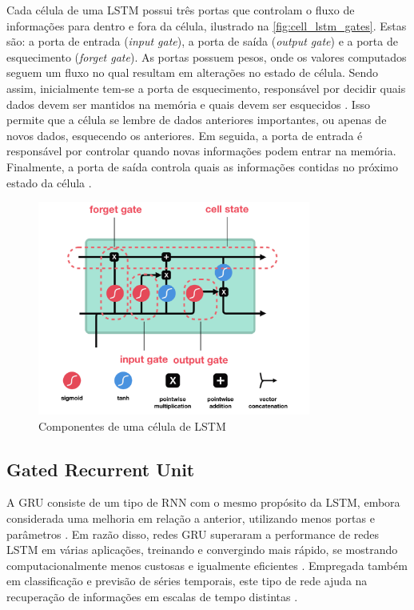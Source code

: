 Cada célula de uma LSTM possui três portas que controlam o fluxo de informações para dentro e fora da célula, ilustrado na \autoref{fig:cell_lstm_gates}. Estas são: a porta de entrada (\textit{input gate}), a porta de saída (\textit{output gate}) e a porta de esquecimento (\textit{forget gate}). As portas possuem pesos, onde os valores computados seguem um fluxo no qual resultam em alterações no estado de célula. Sendo assim, inicialmente tem-se a porta de esquecimento, responsável por decidir quais dados devem ser mantidos na memória e quais devem ser esquecidos \cite{Phi2020}. Isso permite que a célula se lembre de dados anteriores importantes, ou apenas de novos dados, esquecendo os anteriores. Em seguida, a porta de entrada é responsável por controlar quando novas informações podem entrar na memória. Finalmente, a porta de saída controla quais as informações contidas no próximo estado da célula \cite{Jones2017}.

\begin{figure}[h]
  \centering
  \caption{Componentes de uma célula de LSTM}
   \label{fig:cell_lstm_gates}
   \includegraphics[width=0.8\textwidth]{figuras/fig_9.png}
\end{figure}

\subsection{Gated Recurrent Unit}

A GRU consiste de um tipo de RNN com o mesmo propósito da LSTM, embora considerada uma melhoria em relação a anterior, utilizando menos portas e parâmetros \cite{Kumar2019,Bianchi2017}. Em razão disso, redes GRU superaram a performance de redes LSTM em várias aplicações, treinando e convergindo mais rápido, se mostrando computacionalmente menos custosas e igualmente eficientes \cite{Kumar2019,Bianchi2017}. Empregada também em classificação e previsão de séries temporais, este tipo de rede ajuda na recuperação de informações em escalas de tempo distintas \cite{Bianchi2017,Kumar2019}. 

